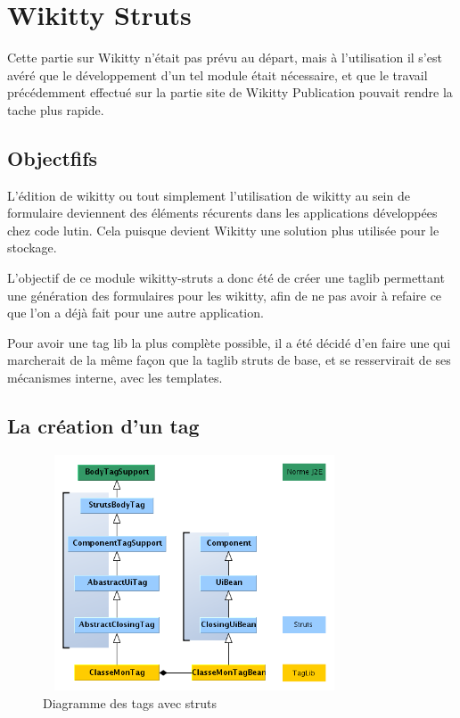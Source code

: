 \section{Wikitty Struts}

Cette partie sur Wikitty n'était pas prévu au départ, mais à l'utilisation
il s'est avéré que le développement d'un tel module était nécessaire, et que
le travail précédemment effectué sur la partie site de Wikitty Publication
pouvait rendre la tache plus rapide.


\subsection{Objectfifs}

L'édition de wikitty ou tout simplement l'utilisation de wikitty au sein de 
formulaire deviennent des éléments récurents dans les applications développées 
chez code lutin. Cela puisque devient Wikitty une solution plus utilisée pour 
le stockage.

L'objectif de ce module wikitty-struts a donc été de créer une taglib permettant
une génération des formulaires pour les wikitty, afin de ne pas avoir à refaire
ce que l'on a déjà fait pour une autre application.

Pour avoir une tag lib la plus complète possible, il a été décidé d'en faire une
qui marcherait de la même façon que la taglib struts de base, et se resservirait
de ses mécanismes interne, avec les templates.

\subsection{La création d'un tag}

\begin{figure}[!ht]
\centering
\includegraphics[height=7cm,width=9cm]{image/explicationTag.png}
  		\caption{Diagramme des tags avec struts}
  		\label{diagtagstruts}
\end{figure}

